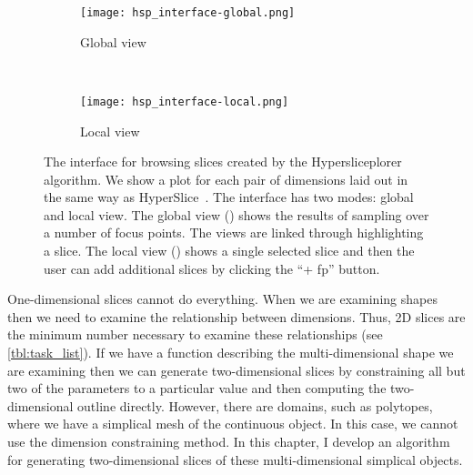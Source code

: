 
\begin{figure}
  \centering
  \begin{subfigure}[b]{0.45\linewidth}
    \texttt{[image: hsp\_interface-global.png]}
    \caption{Global view}
    \label{fig:interface:global} 
  \end{subfigure} 
  ~
  \begin{subfigure}[b]{0.45\linewidth}
    \texttt{[image: hsp\_interface-local.png]}
    \caption{Local view}
    \label{fig:interface:local} 
  \end{subfigure}
  \caption[The interface for browsing slices created by the Hypersliceplorer algorithm.]{%
    The interface for browsing slices created by the Hypersliceplorer algorithm.
    We show a plot for each pair of dimensions laid out in the same way as
    HyperSlice~\cite{Wijk:1993}.
    The interface has two modes: global and local view.
    The global view () 
    shows the results of sampling over a number of focus points. The views
    are linked through highlighting a slice. The local view 
    () shows a single selected slice and then
    the user can add additional slices by clicking the ``+ fp'' button.
  }
  \label{fig:interface}
\end{figure}

One-dimensional slices cannot do everything. When we are examining shapes then
we need to examine the relationship between dimensions. Thus, 2D slices are the
minimum number necessary to examine these relationships (see
\autoref{tbl:task_list}).  If we have a function describing the
multi-dimensional shape we are examining then we can generate two-dimensional
slices by constraining all but two of the parameters to a particular value and
then computing the two-dimensional outline directly. However, there are
domains, such as polytopes, where we have a simplical mesh of the continuous
object. In this case, we cannot use the dimension constraining method. In this
chapter, I develop an algorithm for generating two-dimensional slices of these
multi-dimensional simplical objects. 









